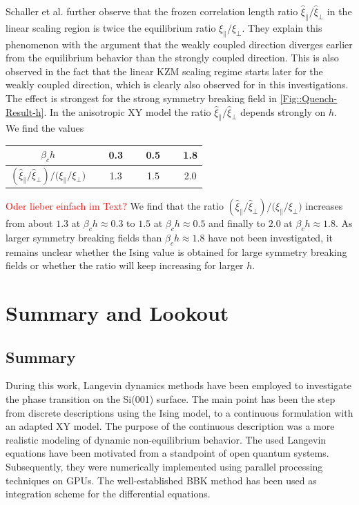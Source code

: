 	Schaller et al. further observe that the frozen correlation length ratio $\hat{\xi}_\parallel / \hat{\xi}_\perp$ in the linear scaling region is twice the equilibrium ratio $\xi_\parallel / \xi_\perp$. They explain this phenomenon with the argument that the weakly coupled direction diverges earlier from the equilibrium behavior than the strongly coupled direction. This is also observed in the fact that the linear KZM scaling regime starts later for the weakly coupled direction, which is clearly also observed for in this investigations. The effect is strongest for the strong symmetry breaking field in \autoref{Fig::Quench-Result-h}. In the anisotropic XY model the ratio $\hat{\xi}_\parallel / \hat{\xi}_\perp$ depends strongly on $h$. We find the values
	\begin{table}[h]
	\centering
	\begin{tabular}{c | c c c}
		$\beta_c h$  & $\quad$ 0.3 $\quad$ & 0.5 $\quad$ & 1.8\\
		\midrule
		$ \left({\hat{\xi}_\parallel}/{\hat{\xi}_\perp}\right) \Big / \Big({{\xi}_\parallel} /	{{\xi}_\perp}\Big) $ & 1.3 & 1.5 $\quad$ & 2.0 \\
		\end{tabular}
		\label{Table::frozen-corr-length-ratio}
	\end{table}
	\textcolor{red}{Oder lieber einfach im Text?} We find that the ratio $ \left({\hat{\xi}_\parallel}/{\hat{\xi}_\perp}\right) \Big / \Big({{\xi}_\parallel} / {{\xi}_\perp}\Big) $ increases from about $1.3$ at $\beta_c h \approx	0.3$ to $1.5$ at $\beta_c h \approx	0.5$ and finally to $2.0$ at $\beta_c h \approx	1.8$. As larger symmetry breaking fields than $\beta_c h \approx	1.8$ have not been investigated, it remains unclear whether the Ising value is obtained for large symmetry breaking fields or whether the ratio will keep increasing for larger $h$.
	\chapter{Summary and Lookout} \label{Chapter::Summary-Lookout}
	\section{Summary}
	During this work, Langevin dynamics methods have been employed to investigate the phase transition on the Si(001) surface. The main point has been the step from discrete descriptions using the Ising model, to a continuous formulation with an adapted XY model. The purpose of the continuous description was a more realistic modeling of dynamic non-equilibrium behavior. The used Langevin equations have been motivated from a standpoint of open quantum systems. Subsequently, they were  numerically implemented using parallel processing techniques on GPUs. The well-established BBK method has been used as integration scheme for the differential equations. \\
	
